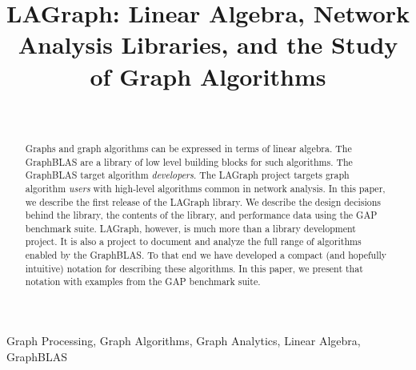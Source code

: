 \documentclass[conference]{IEEEtran}
\begin{document}
\title{LAGraph: Linear Algebra, Network Analysis Libraries, and the Study of Graph Algorithms}
\author{ %
 \\
}

\maketitle

\begin{abstract}

Graphs and graph algorithms can be expressed in terms of 
linear algebra. The GraphBLAS are a library of low level building blocks for such algorithms.
The GraphBLAS target algorithm \emph{developers}.  The LAGraph project
targets graph algorithm \emph{users} with high-level algorithms common in network
analysis.   In this paper, we describe 
the first release of the LAGraph library.  We describe the design decisions behind the
library, the contents of the library, and performance data using the GAP benchmark suite.
LAGraph, however, is much more than a library development project.  It is also a
project to document and analyze the full range of algorithms enabled by the GraphBLAS.  To that end
we have developed a compact (and hopefully intuitive) notation for describing
these algorithms.  In this paper, we present that 
notation with examples from the GAP benchmark suite.  

\end{abstract}

\begin{IEEEkeywords}
Graph Processing, Graph Algorithms, Graph Analytics, Linear Algebra, GraphBLAS
\end{IEEEkeywords}
\end{document}
